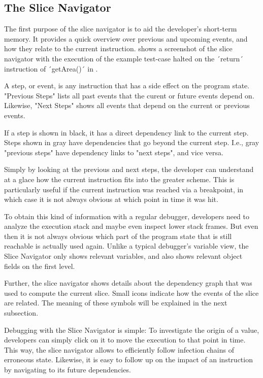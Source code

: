﻿\documentclass[
      english,
			conference,
      ]{IEEEtran}
\begin{document}
\subsection{The Slice Navigator}

The first purpose of the slice navigator is to aid the developer's short-term memory.
It provides a quick overview over previous and upcoming events, and how they relate to the current instruction.
 shows a screenshot of the slice navigator with the execution of the example test-case halted on the ´return´ instruction of ´getArea()´ in .

A step, or event, is any instruction that has a side effect on the program state.
"Previous Steps" lists all past events that the curent or future events depend on.
Likewise, "Next Steps" shows all events that depend on the current or previous events.

If a step is shown in black, it has a direct dependency link to the current step.
Steps shown in gray have dependencies that go beyond the current step.
I.e., gray "previous steps" have dependency links to "next steps", and vice versa.

Simply by looking at the previous and next steps, the developer can understand at a glace how the current instruction fits into the greater scheme.
This is particularly useful if the current instruction was reached via a breakpoint, in which case it is not always obvious at which point in time it was hit.

To obtain this kind of information with a regular debugger, developers need to analyze the execution stack and maybe even inspect lower stack frames.
But even then it is not always obvious which part of the program state that is still reachable is actually used again.
Unlike a typical debugger's variable view, the Slice Navigator only shows relevant variables, and also shows relevant object fields on the first level.

Further, the slice navigator shows details about the dependency graph that was used to compute the current slice.
Small icons indicate how the events of the slice are related.
The meaning of these symbols will be explained in the next subsection.

Debugging with the Slice Navigator is simple:
To investigate the origin of a value, developers can simply click on it to move the execution to that point in time.
This way, the slice navigator allows to efficiently follow infection chains of erroneous state.
Likewise, it is easy to follow up on the impact of an instruction by navigating to its future dependencies.
\end{document}
